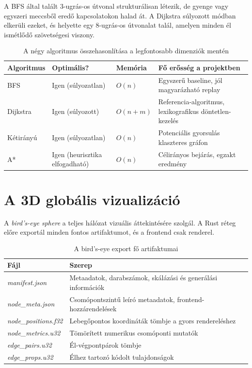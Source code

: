 A BFS által talált 3-ugrás-os útvonal strukturálisan létezik, de gyenge vagy egyszeri meccsből eredő kapcsolatokon halad át. A Dijkstra súlyozott módban elkerüli ezeket, és helyette egy 8-ugrás-os útvonalat talál, amelyen minden él ismétlődő szövetségesi viszony.

\begin{table}[H]
\centering
\caption{A négy algoritmus összehasonlítása a legfontosabb dimenziók mentén}
\begin{tabularx}{\textwidth}{>{\raggedright\arraybackslash}p{3cm} >{\raggedright\arraybackslash}p{2.5cm} >{\raggedright\arraybackslash}X >{\raggedright\arraybackslash}X}
\toprule
\textbf{Algoritmus} & \textbf{Optimális?} & \textbf{Memória} & \textbf{Fő erősség a projektben} \\
\midrule
BFS & Igen (súlyozatlan) & $O(n)$ & Egyszerű baseline, jól magyarázható replay \\
Dijkstra & Igen (súlyozott) & $O(n + m)$ & Referencia-algoritmus, lexikografikus döntetlen-kezelés \\
Kétirányú & Igen (súlyozatlan) & $O(n)$ & Potenciális gyorsulás klaszteres gráfon \\
A* & Igen (heurisztika elfogadható) & $O(n)$ & Célirányos bejárás, egzakt eredmény \\
\bottomrule
\end{tabularx}
\end{table}

\section{A 3D globális vizualizáció}

A \textit{bird's-eye sphere} a teljes hálózat vizuális áttekintésére szolgál. A Rust réteg előre exportál minden fontos artifaktumot, és a frontend csak renderel.

\begin{table}[H]
\centering
\caption{A bird's-eye export fő artifaktumai}
\begin{tabularx}{\textwidth}{>{\raggedright\arraybackslash}p{4.2cm}X}
\toprule
\textbf{Fájl} & \textbf{Szerep} \\
\midrule
\textit{manifest.json} & Metaadatok, darabszámok, skálázási és generálási információk \\
\textit{node\_meta.json} & Csomópontszintű leíró metaadatok, frontend-hozzárendelések \\
\textit{node\_positions.f32} & Lebegőpontos koordináták tömbje a gyors rendereléshez \\
\textit{node\_metrics.u32} & Tömörített numerikus csomóponti mutatók \\
\textit{edge\_pairs.u32} & Él-végpontpárok tömbje \\
\textit{edge\_props.u32} & Élhez tartozó kódolt tulajdonságok \\
\bottomrule
\end{tabularx}
\end{table}

